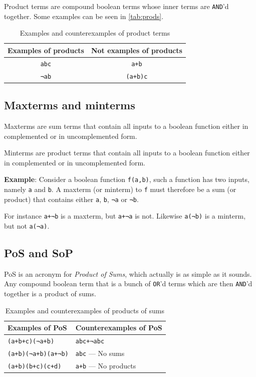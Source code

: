 \documentclass[a4paper,11pt]{report}
\newcommand{\enot}{¬}
\begin{document}
Product terms are compound boolean terms whose inner terms are
\texttt{AND}'d together. Some examples can be seen in
\autoref{tab:prods}.

\begin{table}[H]
  \centering
  \begin{tabular}{c | c}
    \textbf{Examples of products} & \textbf{Not examples of products} \\ \hline
    \texttt{abc}      & \texttt{a+b} \\
    \texttt{\enot{a}b} & \texttt{(a+b)c}
  \end{tabular}
  \caption[Example of product terms]{Examples and counterexamples of
    product terms}%
  \label{tab:prods}
\end{table}

\subsection{Maxterms and minterms}

Maxterms are sum terms that contain all inputs to a boolean function
either in complemented or in uncomplemented form.

Minterms are product terms that contain all inputs to a boolean
function either in complemented or in uncomplemented form.

\textbf{Example}: Consider a boolean function \texttt{f(a,b)}, such a
function has two inputs, namely \texttt{a} and \texttt{b}. A maxterm
(or minterm) to \texttt{f} must therefore be a sum (or product) that
contains either \texttt{a}, \texttt{b}, \texttt{\enot{a}} or
\texttt{\enot{b}}.

For instance \texttt{a+\enot{b}} is a maxterm, but \texttt{a+\enot{a}}
is not. Likewise \texttt{a(\enot{b})} is a minterm, but not
\texttt{a(\enot{a})}.

\subsection{PoS and SoP}

PoS is an acronym for \textit{Product of Sums}, which actually is as
simple as it sounds. Any compound boolean term that is a bunch of
\texttt{OR}'d terms which are then \texttt{AND}'d together is a
product of sums.

\begin{table}[H]
  \centering
  \begin{tabular}{l | l}
    \textbf{Examples of PoS} & \textbf{Counterexamples of PoS} \\ \hline
    \texttt{(a+b+c)(\enot{a}+b)}           & \texttt{abc+\enot{a}bc} \\
    \texttt{(a+b)(\enot{a}+b)(a+\enot{b})} & \texttt{abc} --- No sums \\
    \texttt{(a+b)(b+c)(c+d)}               & \texttt{a+b} --- No products
  \end{tabular}
  \caption[Example of PoS]{Examples and counterexamples of products of sums}%
  \label{tab:pos}
\end{table}
\end{document}
